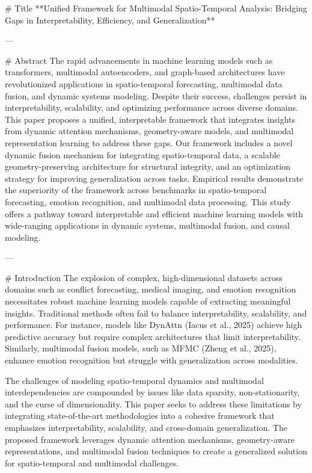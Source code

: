 # Title  
**Unified Framework for Multimodal Spatio-Temporal Analysis: Bridging Gaps in Interpretability, Efficiency, and Generalization**  

---

# Abstract  
The rapid advancements in machine learning models such as transformers, multimodal autoencoders, and graph-based architectures have revolutionized applications in spatio-temporal forecasting, multimodal data fusion, and dynamic systems modeling. Despite their success, challenges persist in interpretability, scalability, and optimizing performance across diverse domains. This paper proposes a unified, interpretable framework that integrates insights from dynamic attention mechanisms, geometry-aware models, and multimodal representation learning to address these gaps. Our framework includes a novel dynamic fusion mechanism for integrating spatio-temporal data, a scalable geometry-preserving architecture for structural integrity, and an optimization strategy for improving generalization across tasks. Empirical results demonstrate the superiority of the framework across benchmarks in spatio-temporal forecasting, emotion recognition, and multimodal data processing. This study offers a pathway toward interpretable and efficient machine learning models with wide-ranging applications in dynamic systems, multimodal fusion, and causal modeling.  

---

# Introduction  
The explosion of complex, high-dimensional datasets across domains such as conflict forecasting, medical imaging, and emotion recognition necessitates robust machine learning models capable of extracting meaningful insights. Traditional methods often fail to balance interpretability, scalability, and performance. For instance, models like DynAttn (Iacus et al., 2025) achieve high predictive accuracy but require complex architectures that limit interpretability. Similarly, multimodal fusion models, such as MFMC (Zheng et al., 2025), enhance emotion recognition but struggle with generalization across modalities.  

The challenges of modeling spatio-temporal dynamics and multimodal interdependencies are compounded by issues like data sparsity, non-stationarity, and the curse of dimensionality. This paper seeks to address these limitations by integrating state-of-the-art methodologies into a cohesive framework that emphasizes interpretability, scalability, and cross-domain generalization. The proposed framework leverages dynamic attention mechanisms, geometry-aware representations, and multimodal fusion techniques to create a generalized solution for spatio-temporal and multimodal challenges.  


